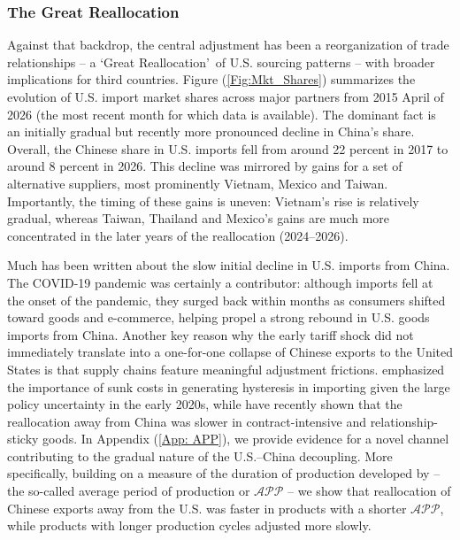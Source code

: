 \documentclass[english,12pt]{article}
\theoremstyle{definition}
\let\oldref\ref
\renewcommand{\ref}[1]{(\oldref{#1})}
\begin{document}
\subsubsection*{The Great Reallocation}

Against that backdrop, the central adjustment has been a reorganization of
trade relationships -- a `Great Reallocation'\ of U.S. sourcing patterns --
with broader implications for third countries. Figure \ref{Fig:Mkt_Shares}
summarizes the evolution of U.S. import market shares across major partners
from 2015 April of 2026 (the most recent month for which
data is available). The dominant fact is an initially gradual but recently
more pronounced decline in China's share. Overall, the Chinese share in U.S. imports fell from around 22 percent in 2017 to around 8 percent in 2026. This decline was mirrored by gains for a set of
alternative suppliers, most prominently Vietnam, Mexico and Taiwan.
Importantly, the timing of these gains is uneven: Vietnam's rise is
relatively gradual, whereas Taiwan, Thailand and Mexico's gains are much more
concentrated in the later years of the reallocation (2024--2026).

Much has been written about the slow initial decline in U.S. imports from
China. The COVID-19 pandemic was certainly a contributor: although imports
fell at the onset of the pandemic, they surged back within months as
consumers shifted toward goods and e-commerce, helping propel a strong
rebound in U.S. goods imports from China. Another key reason why the early
tariff shock did not immediately translate into a one-for-one collapse of
Chinese exports to the United States is that supply chains feature
meaningful adjustment frictions. \cite{Antras2021DeglobalisationECB}
emphasized the importance of sunk costs in generating hysteresis in
importing given the large policy uncertainty in the early 2020s, while \cite%
{AlfaroChor2025AnatomyGreatReallocation} have recently shown that the
reallocation away from China was slower in contract-intensive and
relationship-sticky goods. In Appendix \ref{App: APP}, we provide evidence
for a novel channel contributing to the gradual nature of the U.S.--China
decoupling. More specifically, building on a measure of the duration of
production developed by \cite{antras2025measuring} -- the so-called average
period of production or $\mathcal{APP}$ -- we show that reallocation of Chinese 
exports away from the U.S. was faster in products with a shorter $\mathcal{APP}$,
while products with longer production cycles adjusted more slowly.
\end{document}
